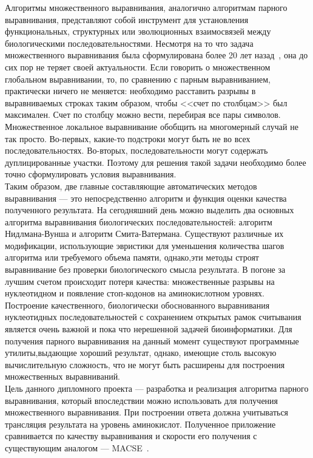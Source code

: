 \indent Алгоритмы множественного выравнивания, аналогично алгоритмам парного выравнивания, представляют собой инструмент для установления функциональных, структурных или эволюционных взаимосвязей между биологическими последовательностями.  Несмотря на то что задача множественного выравнивания была сформулирована более 20 лет назад~\cite{SIAM_Journal}, она до сих пор не теряет своей актуальности. Если говорить о множественном глобальном выравнивании, то, по сравнению с парным выравниванием, практически ничего не меняется: необходимо расставить разрывы в выравниваемых строках таким образом, чтобы <<счет по столбцам>> был максимален. Счет по столбцу можно вести, перебирая все пары символов. Множественное локальное выравнивание обобщить на многомерный случай не так просто. Во-первых, какие-то подстроки могут быть не во всех последовательностях. Во-вторых, последовательности могут содержать дуплицированные участки. Поэтому для решения такой задачи необходимо более точно сформулировать условия выравнивания.\\ 
\indent Таким образом, две главные составляющие автоматических методов выравнивания --- это непосредственно алгоритм и функция оценки качества полученного результата. На сегодняшний день можно выделить два основных алгоритма выравнивания биологических последовательностей: алгоритм Нидлмана-Вунша и алгоритм Смита-Ватермана.  Существуют различные их модификации, использующие эвристики для уменьшения количества шагов алгоритма или требуемого объема памяти, однако,эти методы строят выравнивание без проверки биологического смысла результата. В погоне за лучшим счетом происходит потеря качества: множественные разрывы на нуклеотидном и появление стоп-кодонов на аминокислотном уровнях.\\ 
\indent Построение качественного, биологически обоснованного выравнивания нуклеотидных последовательностей с сохранением открытых рамок считывания является очень важной и пока что нерешенной задачей биоинформатики. Для получения парного выравнивания на данный момент существуют программные утилиты,выдающие хороший результат, однако, имеющие столь высокую вычислительную сложность, что не могут быть расширены для построения множественных выравниваний.\\ 
\indent Цель данного дипломного проекта --- разработка и реализация алгоритма парного выравнивания, который впоследствии можно использовать для получения множественного выравнивания. При построении ответа должна учитываться трансляция результата на уровень аминокислот. Полученное приложение сравнивается по качеству выравнивания и скорости его получения с существующим аналогом --- MACSE~\cite{MACSE}.